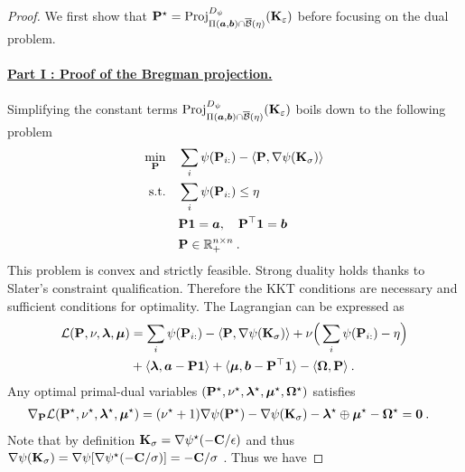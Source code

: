 \begin{proof}
    We first show that ${\mathbf{P}}^\star = \operatorname{Proj}^{D_\psi}_{\Pi(\bm{a}, \bm{b}) \cap \overline{\mathcal{B}}(\eta)}({\mathbf{K}}_\varepsilon)$ before focusing on the dual problem.

    \paragraph{\underline{Part I : Proof of the Bregman projection.}}

    Simplifying the constant terms $\operatorname{Proj}^{D_\psi}_{\Pi(\bm{a}, \bm{b}) \cap \overline{\mathcal{B}}(\eta)}({\mathbf{K}}_\varepsilon)$ boils down to the following problem
    \begin{align}
        \min_{{\mathbf{P}}} \quad &\sum_i \psi({\mathbf{P}}_{i:}) - \langle {\mathbf{P}}, \nabla \psi({\mathbf{K}}_\sigma) \rangle \\
        \text{s.t.} \quad &\sum_i \psi({\mathbf{P}}_{i:}) \leq \eta \\
        & {\mathbf{P}} \bm{1} = \bm{a}, \quad {\mathbf{P}}^\top \bm{1} = \bm{b} \\
        & {\mathbf{P}} \in \mathbb{R}_+^{n \times n} \:.
    \end{align}
    This problem is convex and strictly feasible. Strong duality holds thanks to Slater's constraint qualification. Therefore the KKT conditions \citep{boyd2004convex} are necessary and sufficient conditions for optimality.
    The Lagrangian can be expressed as
    \begin{align}
        \mathcal{L}({\mathbf{P}}, \nu, \bm{\lambda}, \bm{\mu}) &= \sum_i \psi({\mathbf{P}}_{i:}) - \langle {\mathbf{P}}, \nabla \psi({\mathbf{K}}_\sigma) \rangle + \nu\Big(\sum_i \psi({\mathbf{P}}_{i:}) - \eta \Big) \\
        &+ \langle \bm{\lambda}, \bm{a} - {\mathbf{P}} \bm{1} \rangle + \langle \bm{\mu}, \bm{b} - {\mathbf{P}}^\top \bm{1} \rangle - \langle \mathbf{\Omega}, {\mathbf{P}} \rangle \:.
    \end{align}
    Any optimal primal-dual variables $({\mathbf{P}}^\star, \nu^\star, \bm{\lambda}^\star, \bm{\mu}^\star, \mathbf{\Omega}^\star)$ satisfies
    \begin{align}
            \nabla_{{\mathbf{P}}} \mathcal{L}({\mathbf{P}}^\star,  \nu^\star, \bm{\lambda}^\star, \bm{\mu}^\star) &=  (\nu^\star + 1) \nabla \psi({\mathbf{P}}^\star) - \nabla \psi({\mathbf{K}}_\sigma) - \bm{\lambda}^\star \oplus \bm{\mu}^\star - \mathbf{\Omega}^\star = \bm{0} \:.
    \end{align}
    Note that by definition ${\mathbf{K}}_\sigma = \nabla \psi^\star(-{\mathbf{C}}/\epsilon)$ and thus $\nabla \psi({\mathbf{K}}_\sigma) = \nabla \psi[\nabla \psi^\star(-{\mathbf{C}}/\sigma)] = -{\mathbf{C}} / \sigma$ \cite{rockafellar1997convex}. Thus we have 

\end{proof}
